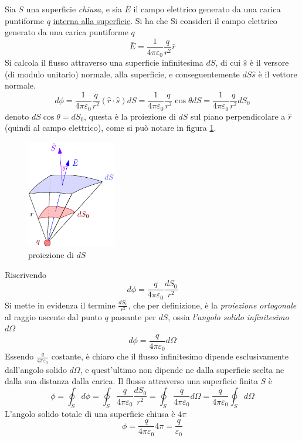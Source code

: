 \documentclass[10pt, letterpaper]{report}
\begin{document}
 Sia $S$ una superficie \textit{chiusa}, e sia $\bar E$ il campo elettrico generato da una carica puntiforme $q$ \underline{interna alla superficie}. Si ha che 
\dimo{} Si consideri il campo elettrico generato da una carica puntiforme $q$
$$ \bar E = \frac{1}{4\pi\varepsilon_0}\frac{q}{r^2}\hat r$$
Si calcola il flusso attraverso una superficie infinitesima $dS$, di cui $\hat s$ è il versore (di modulo unitario) normale, alla superficie, e conseguentemente $dS\hat s$ è il vettore normale. 
$$d\phi =  \frac{1}{4\pi\varepsilon_0}\frac{q}{r^2}(\hat r\cdot \hat s)dS= 
\frac{1}{4\pi\varepsilon_0}\frac{q}{r^2}\cos\theta dS= 
\frac{1}{4\pi\varepsilon_0}\frac{q}{r^2}dS_0$$
denoto $dS\cos\theta=dS_0$, questa è la proiezione di $dS$ sul piano perpendicolare a $\hat r$ (quindi al campo elettrico), come si può notare in figura \ref{Gauss3}.
\begin{figure}[h!]\centering
    \includegraphics[width=0.35\textwidth]{images/Gauss3.pdf}
    \caption{proiezione di $dS$}
    \label{Gauss3}
\end{figure}
Riscrivendo 
$$ d\phi = \frac{q}{4\pi\varepsilon_0}\frac{dS_0}{r^2}$$
Si mette in evidenza il termine $\frac{dS_0}{r^2}$, che per definizione, è la \textit{proiezione ortogonale} al raggio uscente dal punto $q$ passante per $dS$, ossia \textit{l'angolo solido infinitesimo} $d\Omega$
$$ d\phi = \frac{q}{4\pi\varepsilon_0} d\Omega$$
Essendo $\frac{q}{4\pi\varepsilon_0}$ costante, è chiaro che il flusso infinitesimo dipende esclusivamente dall'angolo solido $d\Omega$, e quest'ultimo non dipende ne dalla superficie scelta ne dalla sua distanza dalla carica. Il flusso attraverso una superficie finita $S$ è 
$$\phi=\oint_S d\phi = \oint_S \frac{q}{4\pi\varepsilon_0}\frac{dS_0}{r^2} = 
\oint_S \frac{q}{4\pi\varepsilon_0} d\Omega=\frac{q}{4\pi\varepsilon_0}\oint_S d\Omega$$
L'angolo solido totale di una superficie chiusa è $4\pi$
$$ \phi = \frac{q}{4\pi\varepsilon_0}4\pi = \frac{q}{\varepsilon_0} $$
\end{document}
